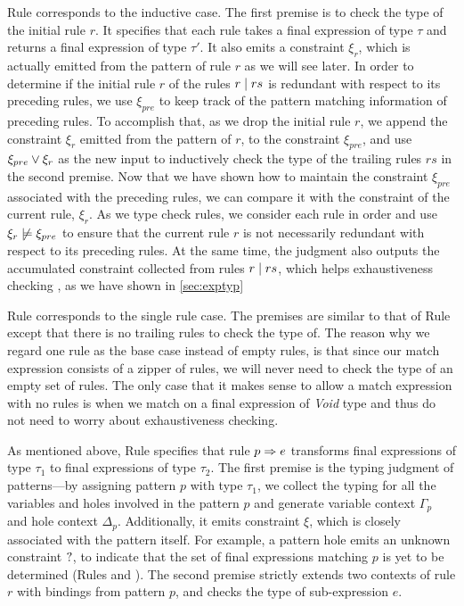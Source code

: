 Rule \TRules corresponds to the inductive case. The first premise is to check
the type of the initial rule $r$. It specifies that each rule takes a final expression
of type $\tau$ and returns a final expression of type $\tau'$. It also emits
a constraint $\xi_r$, which is actually emitted from the pattern of rule $r$ as
we will see later. In order to determine if the initial rule $r$ of the rules
$r \mid rs$ is redundant with respect to its preceding rules, we use
$\xi_{pre}$ to keep track of the pattern matching information of preceding
rules. To accomplish that, as we drop the initial rule $r$, we append the
constraint $\xi_r$ emitted from the pattern of $r$, to the constraint
$\xi_{pre}$, and use $\xi_{pre} \vee \xi_r$ as the new input to inductively check the type
of the trailing rules $rs$ in the second premise. Now that we have shown how to maintain the
constraint $\xi_{pre}$ associated with the preceding rules, we can compare it
with the constraint of the current rule, $\xi_r$. As we type check rules, we consider each rule in order and use
$\cnotsatisfy{\xi_r}{\xi_{pre}}$ to ensure that the current rule $r$ is not necessarily redundant with respect to its preceding rules. At the same time, the judgment also outputs the accumulated
constraint collected from rules $r \mid rs$, which helps exhaustiveness checking
, as we have shown in \autoref{sec:exptyp}

Rule \TOneRules corresponds to the single rule case. The premises are similar to that of Rule \TRules except that
there is no trailing rules to check the type of. The reason why we regard one
rule as the base case instead of empty rules, is that since our match expression
consists of a zipper of rules, we will never need to check the type of an empty set of rules. The
only case that it makes sense to allow a match expression with no rules is when we match on a final expression of \textit{Void} type and thus
do not need to worry about exhaustiveness checking.

As mentioned above, Rule \TRule specifies that rule
$p \Rightarrow e$ transforms final expressions of type $\tau_1$ to final expressions
of type $\tau_2$. The first premise is the typing judgment of patterns---by
assigning pattern $p$ with type $\tau_1$, we collect the typing for all the
variables and holes involved in the pattern $p$ and generate variable context
$\Gamma_p$ and hole context $\Delta_p$. Additionally, it emits constraint $\xi$,
which is closely associated with the pattern itself. For example, a pattern hole emits an 
unknown constraint $\mathtt{?}$, to indicate that the set of final expressions
matching $p$ is yet to be determined (Rules \PTEHole and \PTHole). The second premise strictly extends two contexts of
rule $r$ with bindings from pattern $p$, and checks the type of
sub-expression $e$.

